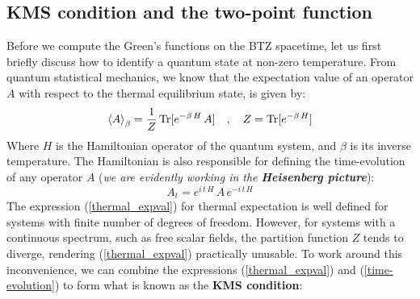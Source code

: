 \subsection{KMS condition and the two-point function}
Before we compute the Green's functions on the BTZ spacetime, let us first briefly discuss how to identify a quantum state at non-zero temperature. From quantum statistical mechanics, we know that the expectation value of an operator $A$ with respect to the thermal equilibrium state, is given by:
%
%
\begin{equation}\label{thermal_expval}
\braket{A}_{\beta} = \frac{1}{Z} \, \mathrm{Tr}[e^{-\beta \, H} \, A]
\quad , \quad
Z = \mathrm{Tr}[e^{-\beta \, H}]
\end{equation}
%
%
Where $H$ is the Hamiltonian operator of the quantum system, and $\beta$ is its inverse temperature. The Hamiltonian is also responsible for defining the time-evolution of any operator $A$ (\textit{we are evidently working in the \textbf{Heisenberg picture}}):
%
\begin{equation}\label{time-evolution}
A_{t} = e^{i \, t \, H} \, A \, e^{-i \, t \, H}
\end{equation}
%
%
The expression (\ref{thermal_expval}) for thermal expectation is well defined for systems with finite number of degrees of freedom. However, for systems with a continuous spectrum, such as free scalar fields, the partition function $Z$ tends to diverge, rendering (\ref{thermal_expval}) practically unusable. To work around this inconvenience, we can combine the expressions (\ref{thermal_expval}) and (\ref{time-evolution}) to form what is known as the \textbf{KMS condition}:
